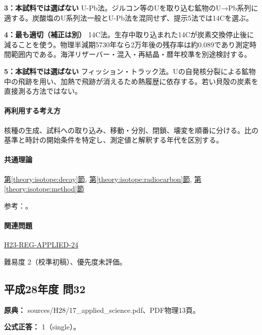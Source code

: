 \noindent\textbf{3：本試料では選ばない} U-Pb法。ジルコン等のUを取り込む鉱物のU→Pb系列に適する。炭酸塩のU系列法一般とU-Pb法を混同せず、提示5法では14Cを選ぶ。\par

\noindent\textbf{4：最も適切（補正は別）} 14C法。生存中取り込まれた14Cが炭素交換停止後に減ることを使う。物理半減期5730年なら2万年後の残存率は約0.089であり測定時間範囲内である。海洋リザーバー・混入・再結晶・暦年校準を別途検討する。\par

\noindent\textbf{5：本試料では選ばない} フィッション・トラック法。Uの自発核分裂による鉱物中の飛跡を用い、加熱で飛跡が消えるため熱履歴に依存する。若い貝殻の炭素を直接測る方法ではない。\par

\paragraph{再利用する考え方} 核種の生成、試料への取り込み、移動・分別、閉鎖、壊変を順番に分ける。比の基準と時計の開始条件を特定し、測定値と解釈する年代を区別する。

\paragraph{共通理論} \hyperref[theory:isotope:decay]{第\ref*{theory:isotope:decay}節}, \hyperref[theory:isotope:radiocarbon]{第\ref*{theory:isotope:radiocarbon}節}, \hyperref[theory:isotope:method]{第\ref*{theory:isotope:method}節}

\par 参考：\cite{iso_radiometric,iso_shell}。

\paragraph{関連問題} \hyperref[q:h23-reg-applied-24]{H23-REG-APPLIED-24}

\par 難易度 2（校準初稿）、優先度未評価。

\subsection{平成28年度 問32}
\label{q:h28-reg-applied-32}

\noindent\textbf{原典：} sources/H28/17\_applied\_science.pdf、PDF物理13頁。

\textbf{公式正答：} 1（single）。

